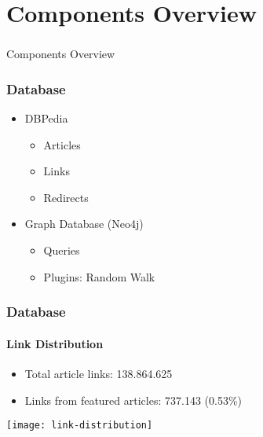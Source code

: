 \section[Components]{Components Overview}

\begin{frame}
  \frametitle{}
  \begin{center}
    {\Huge Components Overview}
  \end{center}
\end{frame}

\begin{frame}
    \frametitle{Database}
    \centering

    \begin{itemize}
      \item DBPedia
      \begin{itemize}
        \item Articles
        \item Links
        \item Redirects
      \end{itemize}
      \item Graph Database (Neo4j)
      \begin{itemize}
        \item Queries
        \item Plugins: Random Walk
      \end{itemize}
    \end{itemize}

\end{frame}

\begin{frame}
    \frametitle{Database}
    \framesubtitle{Link Distribution}
    \centering

    \begin{itemize}
      \item Total article links: 138.864.625 %
      \item Links from featured articles: 737.143 (0.53\%)
    \end{itemize}

    \texttt{[image: link-distribution]}
\end{frame}


